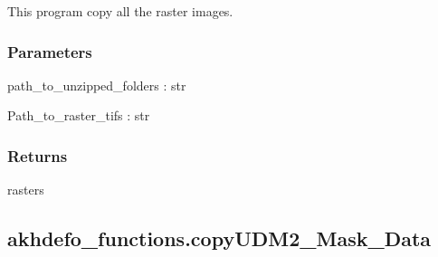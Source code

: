 \documentclass[letterpaper,10pt]{sphinxmanual}
\begin{document}
\begin{fulllineitems}
\label{\detokenize{generated/akhdefo_functions.copyImage_Data:akhdefo_functions.copyImage_Data}}
\pysigstartsignatures
{}
\pysigstopsignatures
\sphinxAtStartPar
This program copy all the raster images.


\subsubsection{Parameters}
\label{\detokenize{generated/akhdefo_functions.copyImage_Data:parameters}}
\sphinxAtStartPar
path\_to\_unzipped\_folders : str

\sphinxAtStartPar
Path\_to\_raster\_tifs : str


\subsubsection{Returns}
\label{\detokenize{generated/akhdefo_functions.copyImage_Data:returns}}
\sphinxAtStartPar
rasters

\end{fulllineitems}


\sphinxstepscope


\subsection{akhdefo\_functions.copyUDM2\_Mask\_Data}
\label{\detokenize{generated/akhdefo_functions.copyUDM2_Mask_Data:akhdefo-functions-copyudm2-mask-data}}\label{\detokenize{generated/akhdefo_functions.copyUDM2_Mask_Data::doc}}
\end{document}
